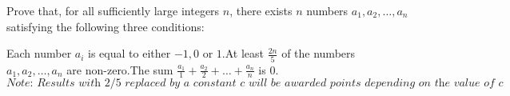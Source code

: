 Prove that, for all sufficiently large integers $n$,  there exists $n$ numbers $a_1, a_2, \dots, a_n$ satisfying the following three conditions:

Each number $a_i$ is equal to either $-1, 0$ or $1$.At least $\frac{2n}{5}$ of the numbers $a_1, a_2, \dots, a_n$ are non-zero.The sum $\frac{a_1}{1} + \frac{a_2}{2} + \dots + \frac{a_n}{n}$ is $0$.$\textit{Note: Results with 2/5 replaced by a constant } c \textit{ will be awarded points depending on the value of } c$